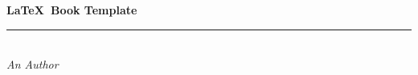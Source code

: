 
\thispagestyle{empty}
{
\begin{center}
\Huge\bfseries\LaTeX\ Book Template\\[-1ex]
\rule{16.5pc}{0.5pt}\\[1in]
\LARGE\normalfont\textit{An Author}
\end{center}
}